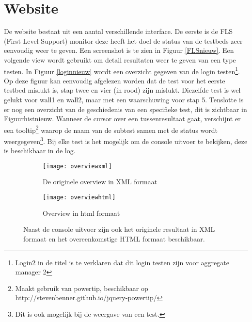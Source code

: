 \section{Website}
\npar
De website bestaat uit een aantal verschillende interface. De eerste is de FLS (First Level Support) monitor deze heeft het doel de status van de testbeds zeer eenvoudig weer te geven. Een screenshot is te zien in Figuur \ref{FLSnieuw}.
\npar
Een volgende view wordt gebruikt om detail resultaten weer te geven van een type testen. In Figuur \ref{loginnieuw} wordt een overzicht gegeven van de login testen\footnote{Login2 in de titel is te verklaren dat dit login testen zijn voor aggregate manager 2}. Op deze figuur kan eenvoudig afgelezen worden dat de test voor het eerste testbed mislukt is, stap twee en vier (in rood) zijn mislukt. Diezelfde test is wel gelukt voor wall1 en wall2, maar met een waarschuwing voor stap 5.
\clearpage
\npar
Tenslotte is er nog een overzicht van de geschiedenis van een specifieke test, dit is zichtbaar in Figuur{histnieuw}. Wanneer de cursor over een tussenresultaat gaat, verschijnt er een tooltip\footnote{Maakt gebruik van powertip, beschikbaar op http://stevenbenner.github.io/jquery-powertip/} waarop de naam van de subtest samen met de status wordt weergegeven\footnote{Dit is ook mogelijk bij de weergave van een test.}.
\npar 
Bij elke test is het mogelijk om de console uitvoer te bekijken, deze is beschikbaar in de log.
\begin{figure}[H]
\centering
\begin{subfigure}{.45\textwidth}
  \centering
  \texttt{[image: overviewxml]}
  \caption{De originele overview in XML formaat}
\end{subfigure}
\begin{subfigure}{.45\textwidth}
  \centering
  \texttt{[image: overviewhtml]}
  \caption{Overview in html formaat}
\end{subfigure}
\caption{Naast de console uitvoer zijn ook het originele resultaat in XML formaat en het overeenkomstige HTML formaat beschikbaar.}
\end{figure}
